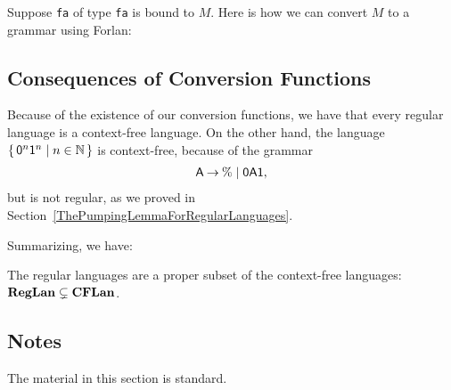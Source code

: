 Suppose \texttt{fa} of type \texttt{fa} is bound to $M$.  Here is how
we can convert $M$ to a grammar using Forlan:


\subsection{Consequences of Conversion Functions}

Because of the existence of our conversion functions, we have that
every regular language is a context-free language.
On the other hand, the language $\{ \, \mathsf{0}^n\mathsf{1}^n \mid n\in\mathbb{N} \, \}$
is context-free, because of the grammar
\begin{gather*}
  \mathsf{A}\mathbin{\to}\%\mid\mathsf{0}\mathsf{A}\mathsf{1} ,
\end{gather*}
but is not regular, as we proved in
Section~\ref{ThePumpingLemmaForRegularLanguages}.

Summarizing, we have:
%
%

\begin{theorem}
The regular languages are a proper subset of the context-free
languages: $\mathbf{RegLan}\subsetneq\mathbf{CFLan}$.
\end{theorem}

\subsection{Notes}

The material in this section is standard.

%
%
%
%

